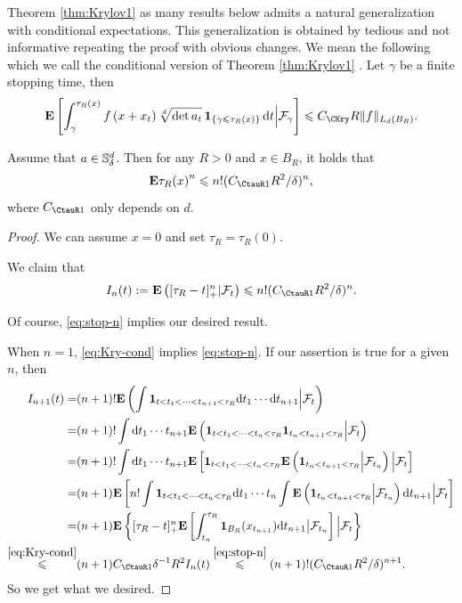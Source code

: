 	Theorem \ref{thm:Krylov1} as many results below admits a natural generalization with conditional expectations. This generalization is obtained by tedious and not informative repeating the proof with obvious changes. We mean the following which we call the conditional version of Theorem \ref{thm:Krylov1} . Let $\gamma$ be a finite stopping time, then %
	\begin{equation}\label{eq:Kry-cond}
		\bE\left[\int_\gamma^{\tau_R(x)} f\left(x+x_t\right) \sqrt[d]{\operatorname{det} a_t} \, \1_{\{\gamma\leq \tau_R(x)\}} \, \d t \Big| \mathcal{F}_\gamma\right] \leq C_{\CKry} R\|f\|_{L_d\left(B_R\right)}. 
	\end{equation}

\begin{lemma}
    Assume that \(a\in {\mathbb S}^d_{\delta}\). Then for any \(R>0\) and \(x\in B_R\), it holds that 
    \[
        \bE {\tau_R(x)}^n \leq n! (C_{\CtauR1}R^2/\delta)^{n}, 
    \]
    where \(C_{\CtauR1}\) only depends on \(d\). 
\end{lemma}
\begin{proof}
    We can assume $x=0$ and set \(\tau_R=\tau_R(0)\). 
    \begin{framed}
        We claim that 
        \begin{equation}\label{eq:stop-n}
            I_n(t):= \bE \l( [\tau_R-t]_+^n |\cF_t\r) \leq n! (C_{\CtauR1}R^2/\delta)^{n}. 
	\end{equation}
    \end{framed}
    Of course, \eqref{eq:stop-n} implies our desired result. 
    
    When $n=1$, \eqref{eq:Kry-cond} implies \eqref{eq:stop-n}. If our assertion is true for a given $n$, then 
    \begin{equation*}
        \begin{aligned}
            I_{n+1}(t)=& (n+1)! \bE \l( \int \1_{t<t_1<\cdots<t_{n+1}<\tau_R} \d t_1\cdots \d t_{n+1} \Big | \cF_t\r)\\
            =& (n+1)! \int \d t_1\cdots t_{n+1} \bE \l( \1_{t<t_1<\cdots<t_n<\tau_R} \1_{t_n<t_{n+1}<\tau_R} \Big| \cF_t\r)\\
            =& (n+1)! \int \d t_1\cdots t_{n+1} \bE \l[ \1_{t<t_1<\cdots<t_n<\tau_R} \bE \l(\1_{t_n<t_{n+1}<\tau_R}\Big| \cF_{t_{n}}\r) \Big| \cF_t\r]\\
            =& (n+1) \bE \l[ n!\int \1_{t<t_1<\cdots<t_n<\tau_R} \d t_1\cdots t_{n}  \int \bE \l(\1_{t_n<t_{n+1}<\tau_R}\Big| \cF_{t_{n}}\r) \d t_{n+1}\Big| \cF_t\r]\\
            =& (n+1) \bE \l\{  [\tau_R-t]_+^n \bE \l[\int_{t_n}^{\tau_R} \1_{B_R}(x_{t_{n+1}}) \d t_{n+1} \big| \cF_{t_n} \r] \Big|\cF_t \r\}\\
            \overset{\eqref{eq:Kry-cond}}{\leq} & (n+1)C_{\CtauR1}\delta^{-1}R^2 I_n(t)\overset{\eqref{eq:stop-n}}{\leq} (n+1)! (C_{\CtauR1}R^2/\delta)^{n+1}. 
        \end{aligned}
    \end{equation*}
    So we get what we desired. 
\end{proof}


